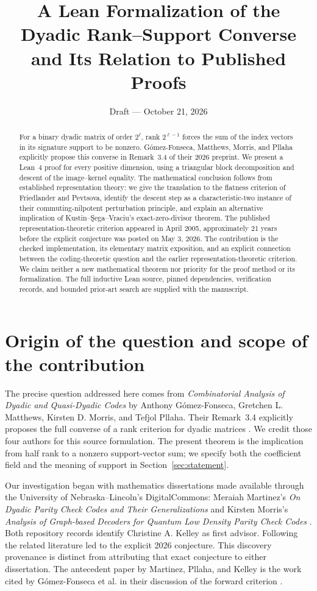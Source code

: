 \documentclass[11pt]{article}
\title{A Lean Formalization of the Dyadic Rank--Support Converse\\
and Its Relation to Published Proofs}
\author{}
\date{Draft --- October 21, 2026}
\theoremstyle{definition}
\begin{document}
\maketitle
\begin{abstract}
For a binary dyadic matrix of order $2^\ell$, rank $2^{\ell-1}$ forces the sum of the index vectors in its signature support to be nonzero. G\'omez-Fonseca, Matthews, Morris, and Pllaha explicitly propose this converse in Remark~3.4 of their 2026 preprint. We present a Lean~4 proof for every positive dimension, using a triangular block decomposition and descent of the image--kernel equality. The mathematical conclusion follows from established representation theory: we give the translation to the flatness criterion of Friedlander and Pevtsova, identify the descent step as a characteristic-two instance of their commuting-nilpotent perturbation principle, and explain an alternative implication of Kustin--\c{S}ega--Vraciu's exact-zero-divisor theorem. The published representation-theoretic criterion appeared in April 2005, approximately 21 years before the explicit conjecture was posted on May 3, 2026. The contribution is the checked implementation, its elementary matrix exposition, and an explicit connection between the coding-theoretic question and the earlier representation-theoretic criterion. We claim neither a new mathematical theorem nor priority for the proof method or its formalization. The full inductive Lean source, pinned dependencies, verification records, and bounded prior-art search are supplied with the manuscript.
\end{abstract}

\section{Origin of the question and scope of the contribution}\label{sec:origin}

The precise question addressed here comes from \emph{Combinatorial Analysis of Dyadic and Quasi-Dyadic Codes} by Anthony G\'omez-Fonseca, Gretchen L. Matthews, Kirsten D. Morris, and Tefjol Pllaha. Their Remark~3.4 explicitly proposes the full converse of a rank criterion for dyadic matrices \cite[Remark~3.4]{gf}. We credit those four authors for this source formulation. The present theorem is the implication from half rank to a nonzero support-vector sum; we specify both the coefficient field and the meaning of support in Section~\ref{sec:statement}.

Our investigation began with mathematics dissertations made available through the University of Nebraska--Lincoln's DigitalCommons: Meraiah Martinez's \emph{On Dyadic Parity Check Codes and Their Generalizations} \cite{martinez} and Kirsten Morris's \emph{Analysis of Graph-based Decoders for Quantum Low Density Parity Check Codes} \cite{morris}. Both repository records identify Christine A. Kelley as first advisor. Following the related literature led to the explicit 2026 conjecture. This discovery provenance is distinct from attributing that exact conjecture to either dissertation. The antecedent paper by Martinez, Pllaha, and Kelley \cite{mpk} is the work cited by G\'omez-Fonseca et al. in their discussion of the forward criterion \cite[Remark~3.4]{gf}.
\end{document}
